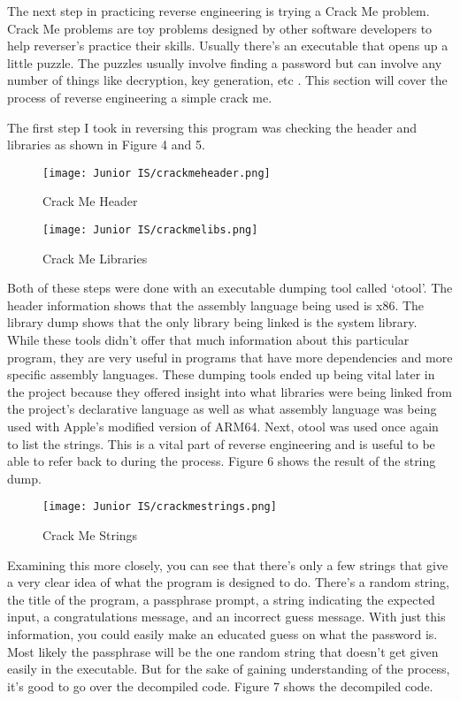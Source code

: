 \documentclass[12pt]{article}
\begin{document}
The next step in practicing reverse engineering is trying a Crack Me problem. Crack Me problems are toy problems designed by other software developers to help reverser's practice their skills. Usually there’s an executable that opens up a little puzzle. The puzzles usually involve finding a password but can involve any number of things like decryption, key generation, etc . This section will cover the process of reverse engineering a simple crack me.

The first step I took in reversing this program was checking the header and libraries as shown in Figure 4 and 5.

\begin{figure}[h]
\caption{Crack Me Header}
\texttt{[image: Junior IS/crackmeheader.png]}
\end{figure}
\begin{figure}[h]
\caption{Crack Me Libraries}
\texttt{[image: Junior IS/crackmelibs.png]}
\end{figure}

Both of these steps were done with an executable dumping tool called ‘otool’. The header information shows that the assembly language being used is x86. The library dump shows that the only library being linked is the system library. While these tools didn’t offer that much information about this particular program, they are very useful in programs that have more dependencies and more specific assembly languages. These dumping tools ended up being vital later in the project because they offered insight into what libraries were being linked from the project's declarative language as well as what assembly language was being used with Apple’s modified version of ARM64. Next, otool was used once again to list the strings. This is a vital part of reverse engineering and is useful to be able to refer back to during the process. Figure 6 shows the result of the string dump.


\begin{figure}[h]
\caption{Crack Me Strings}
\texttt{[image: Junior IS/crackmestrings.png]}
\end{figure}

Examining this more closely, you can see that there’s only a few strings that give a very clear idea of what the program is designed to do. There’s a random string, the title of the program, a passphrase prompt, a string indicating the expected input, a congratulations message, and an incorrect guess message. With just this information, you could easily make an educated guess on what the password is. Most likely the passphrase will be the one random string that doesn’t get given easily in the executable. But for the sake of gaining understanding of the process, it’s good to go over the decompiled code. Figure 7 shows the decompiled code.
\end{document}
